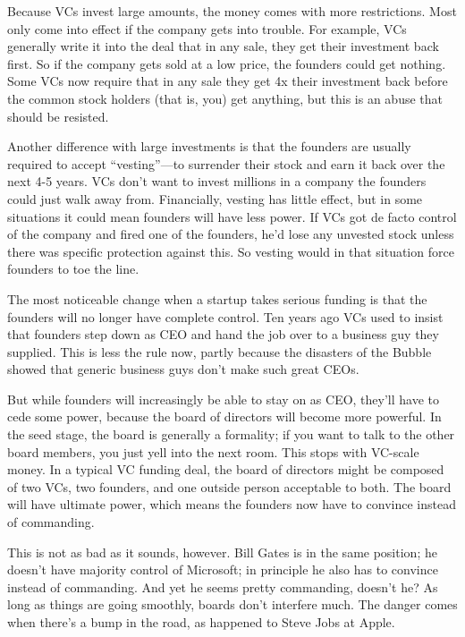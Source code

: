 Because VCs invest large amounts, the money comes with more
restrictions. Most only come into effect if the company gets into
trouble. For example, VCs generally write it into the deal that in any
sale, they get their investment back first. So if the company gets sold
at a low price, the founders could get nothing. Some VCs now require
that in any sale they get 4x their investment back before the common
stock holders (that is, you) get anything, but this is an abuse that
should be resisted.

Another difference with large investments is that the founders are
usually required to accept ``vesting''---to surrender their stock and
earn it back over the next 4-5 years. VCs don't want to invest millions
in a company the founders could just walk away from. Financially,
vesting has little effect, but in some situations it could mean founders
will have less power. If VCs got de facto control of the company and
fired one of the founders, he'd lose any unvested stock unless there was
specific protection against this. So vesting would in that situation
force founders to toe the line.

The most noticeable change when a startup takes serious funding is that
the founders will no longer have complete control. Ten years ago VCs
used to insist that founders step down as CEO and hand the job over to a
business guy they supplied. This is less the rule now, partly because
the disasters of the Bubble showed that generic business guys don't make
such great CEOs.

But while founders will increasingly be able to stay on as CEO, they'll
have to cede some power, because the board of directors will become more
powerful. In the seed stage, the board is generally a formality; if you
want to talk to the other board members, you just yell into the next
room. This stops with VC-scale money. In a typical VC funding deal, the
board of directors might be composed of two VCs, two founders, and one
outside person acceptable to both. The board will have ultimate power,
which means the founders now have to convince instead of commanding.

This is not as bad as it sounds, however. Bill Gates is in the same
position; he doesn't have majority control of Microsoft; in principle he
also has to convince instead of commanding. And yet he seems pretty
commanding, doesn't he? As long as things are going smoothly, boards
don't interfere much. The danger comes when there's a bump in the road,
as happened to Steve Jobs at Apple.

